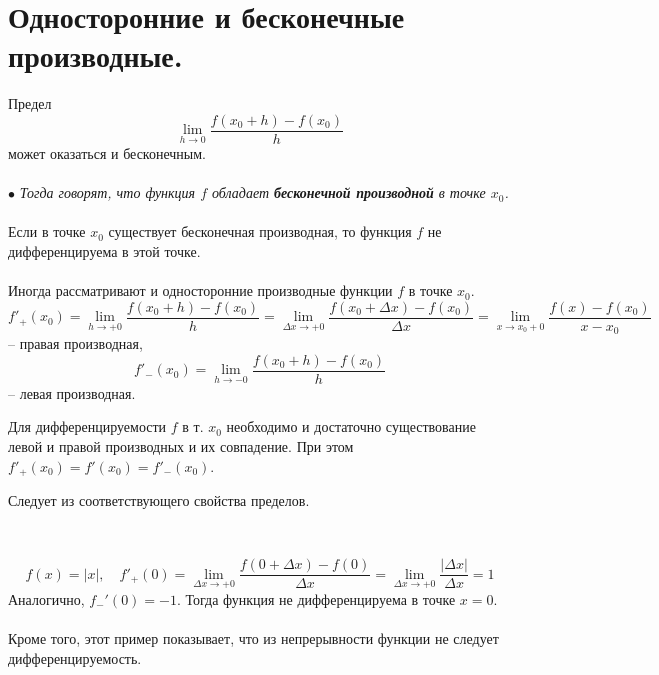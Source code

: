 \section{Односторонние и бесконечные производные.}
Предел
\[\lim_{h\to 0}\frac {f(x_0+h)-f(x_0)}{h}\] может оказаться и бесконечным.\\\\
$\bullet$ \textit{Тогда говорят, что функция $f$ обладает \textbf{бесконечной производной} в точке $x_0$.}\\\\
Если в точке $x_0$ существует бесконечная производная, то функция $f$ не дифференцируема в этой точке.\\\\
Иногда рассматривают и односторонние производные функции $f$ в точке $x_0$.\\
\[f'_+(x_0)=\lim_{h\to +0}\frac {f(x_0+h)-f(x_0)}{h}=\lim_{\Delta x\to +0}\frac {f(x_0+\Delta x)-f(x_0)}{\Delta x}=\lim_{x\to x_0+0}\frac {f(x)-f(x_0)}{x-x_0}\]-- правая производная,
\[f'_-(x_0)=\lim_{h\to -0}\frac {f(x_0+h)-f(x_0)}{h}\] -- левая производная.
\begin{theorem}
	Для дифференцируемости $f$ в т. $x_0$ необходимо и достаточно существование левой и правой производных и их совпадение. При этом $f'_+(x_0)=f'(x_0)=f'_-(x_0).$
\end{theorem}
\begin{Proof}
	Следует из соответствующего свойства пределов.
\end{Proof}\\
\begin{example}
	\[f(x)=|x|,\quad f'_+(0)=\lim_{\Delta x\to +0}\frac {f(0+\Delta x)-f(0)}{\Delta x}=\lim_{\Delta x \to +0}\frac{|\Delta x|}{\Delta x}=1\]
	Аналогично, $f_-'(0)=-1$. Тогда функция не дифференцируема в точке $x=0$.\\\\
	Кроме того, этот пример показывает, что из непрерывности функции не следует дифференцируемость.
\end{example}
